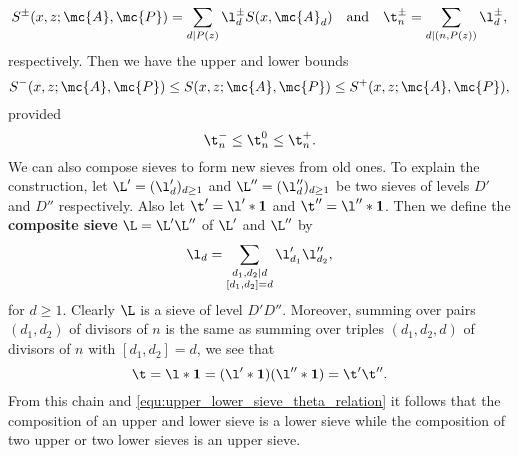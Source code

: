     \[
      S^{\pm}(x,z;\mc{A},\mc{P}) = \sum_{d \mid P(z)}\l_{d}^{\pm}S(x,\mc{A}_{d}) \quad \text{and} \quad \t_{n}^{\pm} = \sum_{d \mid (n,P(z))}\l_{d}^{\pm},
    \]
    respectively. Then we have the upper and lower bounds
    \[
      S^{-}(x,z;\mc{A},\mc{P}) \le S(x,z;\mc{A},\mc{P}) \le S^{+}(x,z;\mc{A},\mc{P}),
    \]
    provided
    \begin{equation}\label{equ:upper_lower_sieve_theta_relation}
      \t_{n}^{-} \le \t_{n}^{0} \le \t_{n}^{+}.
    \end{equation}
    We can also compose sieves to form new sieves from old ones. To explain the construction, let $\L' = (\l'_{d})_{d \ge 1}$ and $\L'' = (\l''_{d})_{d \ge 1}$ be two sieves of levels $D'$ and $D''$ respectively. Also let $\t' = \l' \ast \mathbf{1}$ and $\t'' = \l'' \ast \mathbf{1}$. Then we define the \textbf{composite sieve} $\L = \L'\L''$ of $\L'$ and $\L''$ by
    \[
      \l_{d} = \sum_{\substack{ d_{1},d_{2} \mid d \\ [d_{1},d_{2}] = d}}\l'_{d_{1}}\l''_{d_{2}},
    \]
    for $d \ge 1$. Clearly $\L$ is a sieve of level $D'D''$. Moreover, summing over pairs $(d_{1},d_{2})$ of divisors of $n$ is the same as summing over triples $(d_{1},d_{2},d)$ of divisors of $n$ with $[d_{1},d_{2}] = d$, we see that
    \[
      \t = \l \ast \mathbf{1} = (\l' \ast \mathbf{1})(\l'' \ast \mathbf{1}) = \t'\t''.
    \]
    From this chain and \cref{equ:upper_lower_sieve_theta_relation} it follows that the composition of an upper and lower sieve is a lower sieve while the composition of two upper or two lower sieves is an upper sieve.
